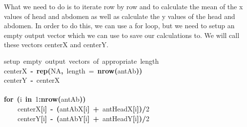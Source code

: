 \documentclass{article}\usepackage{graphicx, color}
\makeatletter
\newcommand{\hlnumber}[1]{\textcolor[rgb]{0,0,0}{#1}}%
\newcommand{\hlfunctioncall}[1]{\textcolor[rgb]{0.501960784313725,0,0.329411764705882}{\textbf{#1}}}%
\newcommand{\hlkeyword}[1]{\textcolor[rgb]{0,0,0}{\textbf{#1}}}%
\newcommand{\hlargument}[1]{\textcolor[rgb]{0.690196078431373,0.250980392156863,0.0196078431372549}{#1}}%
\newcommand{\hlcomment}[1]{\textcolor[rgb]{0.180392156862745,0.6,0.341176470588235}{#1}}%
\newcommand{\hlassignement}[1]{\textcolor[rgb]{0,0,0}{\textbf{#1}}}%
\newcommand{\hlsymbol}[1]{\textcolor[rgb]{0,0,0}{#1}}%
\newcommand{\hlstd}[1]{\textcolor[rgb]{0,0,0}{#1}}%
\newenvironment{kframe}{%
 \def\FrameCommand##1{\hskip\@totalleftmargin \hskip-\fboxsep
 \colorbox{shadecolor}{##1}\hskip-\fboxsep
     \hskip-\linewidth \hskip-\@totalleftmargin \hskip\columnwidth}%
 \MakeFramed {\advance\hsize-\width
   \@totalleftmargin\z@ \linewidth\hsize
   \@setminipage}}%
 {\par\unskip\endMakeFramed}
\newenvironment{knitrout}{}{} %
\makeatother
\begin{document}
What we need to do is to iterate row by row and to calculate the mean of the x values of head and abdomen as well as calculate the y values of the head and abdomen. In order to do this, we can use a for loop, but we need to setup an empty output vector which we can use to save our calculations to. We will call these vectors centerX and centerY.

\begin{knitrout}
\color{fgcolor}\begin{kframe}
\begin{flushleft}
\ttfamily\noindent
\hlcomment{\usebox{\hlnormalsizeboxhash}{\ }setup{\ }empty{\ }output{\ }vectors{\ }of{\ }appropriate{\ }length}\hspace*{\fill}\\
\hlstd{}\hlsymbol{centerX}{\ }\hlassignement{\usebox{\hlnormalsizeboxlessthan}-}{\ }\hlfunctioncall{rep}\hlkeyword{(}\hlnumber{NA}\hlkeyword{,}{\ }\hlargument{length}{\ }\hlargument{=}{\ }\hlfunctioncall{nrow}\hlkeyword{(}\hlsymbol{antAb}\hlkeyword{)}\hlkeyword{)}\hspace*{\fill}\\
\hlstd{}\hlsymbol{centerY}{\ }\hlassignement{\usebox{\hlnormalsizeboxlessthan}-}{\ }\hlsymbol{centerX}\hspace*{\fill}\\
\hlstd{}\hspace*{\fill}\\
\hlstd{}\hlkeyword{for}{\ }\hlkeyword{(}\hlsymbol{i}{\ }\hlkeyword{in}{\ }\hlnumber{1}\hlkeyword{:}\hlfunctioncall{nrow}\hlkeyword{(}\hlsymbol{antAb}\hlkeyword{)}\hlkeyword{)}{\ }\hlkeyword{\usebox{\hlnormalsizeboxopenbrace}}\hspace*{\fill}\\
\hlstd{}{\ }{\ }{\ }{\ }\hlsymbol{centerX}\hlkeyword{[}\hlsymbol{i}\hlkeyword{]}{\ }\hlassignement{\usebox{\hlnormalsizeboxlessthan}-}{\ }\hlkeyword{(}\hlsymbol{antAb}\hlkeyword{\usebox{\hlnormalsizeboxdollar}}\hlsymbol{X}\hlkeyword{[}\hlsymbol{i}\hlkeyword{]}{\ }\hlkeyword{+}{\ }\hlsymbol{antHead}\hlkeyword{\usebox{\hlnormalsizeboxdollar}}\hlsymbol{X}\hlkeyword{[}\hlsymbol{i}\hlkeyword{]}\hlkeyword{)}\hlkeyword{/}\hlnumber{2}\hspace*{\fill}\\
\hlstd{}{\ }{\ }{\ }{\ }\hlsymbol{centerY}\hlkeyword{[}\hlsymbol{i}\hlkeyword{]}{\ }\hlassignement{\usebox{\hlnormalsizeboxlessthan}-}{\ }\hlkeyword{(}\hlsymbol{antAb}\hlkeyword{\usebox{\hlnormalsizeboxdollar}}\hlsymbol{Y}\hlkeyword{[}\hlsymbol{i}\hlkeyword{]}{\ }\hlkeyword{+}{\ }\hlsymbol{antHead}\hlkeyword{\usebox{\hlnormalsizeboxdollar}}\hlsymbol{Y}\hlkeyword{[}\hlsymbol{i}\hlkeyword{]}\hlkeyword{)}\hlkeyword{/}\hlnumber{2}\hspace*{\fill}\\

\end{flushleft}
\end{kframe}
\end{knitrout}
\end{document}

